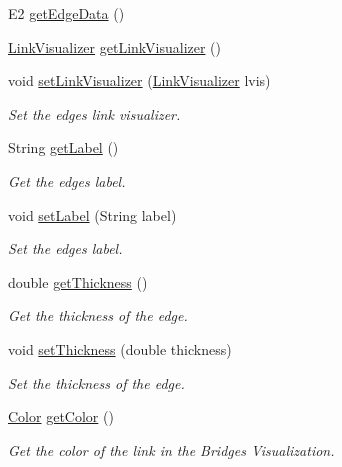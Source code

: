 \begin{DoxyCompactItemize}
\item 
E2 \hyperlink{classbridges_1_1base_1_1_edge_a19a623d647eb17b7e53f1360577b0703}{get\+Edge\+Data} ()
\item 
\hyperlink{classbridges_1_1base_1_1_link_visualizer}{Link\+Visualizer} \hyperlink{classbridges_1_1base_1_1_edge_a11c655622b8a54f2931f59b1d256f84a}{get\+Link\+Visualizer} ()
\item 
void \hyperlink{classbridges_1_1base_1_1_edge_a1bb8008507d26245468bf9d0f1452072}{set\+Link\+Visualizer} (\hyperlink{classbridges_1_1base_1_1_link_visualizer}{Link\+Visualizer} lvis)
\begin{DoxyCompactList}\small\item\em Set the edge\textquotesingle{}s link visualizer. \end{DoxyCompactList}\item 
String \hyperlink{classbridges_1_1base_1_1_edge_a8663708d930e8df460c57d8bdbab44b2}{get\+Label} ()
\begin{DoxyCompactList}\small\item\em Get the edge\textquotesingle{}s label. \end{DoxyCompactList}\item 
void \hyperlink{classbridges_1_1base_1_1_edge_ad5f1d55a3c8caeb975f497dfe4f29242}{set\+Label} (String label)
\begin{DoxyCompactList}\small\item\em Set the edge\textquotesingle{}s label. \end{DoxyCompactList}\item 
double \hyperlink{classbridges_1_1base_1_1_edge_a3431e83235fc5d5dd5cf747ed4853881}{get\+Thickness} ()
\begin{DoxyCompactList}\small\item\em Get the thickness of the edge. \end{DoxyCompactList}\item 
void \hyperlink{classbridges_1_1base_1_1_edge_ae8d87539f03f04479e5f5710ea9bf260}{set\+Thickness} (double thickness)
\begin{DoxyCompactList}\small\item\em Set the thickness of the edge. \end{DoxyCompactList}\item 
\hyperlink{classbridges_1_1base_1_1_color}{Color} \hyperlink{classbridges_1_1base_1_1_edge_a243d9e6a57ebb570dda81bffe0cd4b77}{get\+Color} ()
\begin{DoxyCompactList}\small\item\em Get the color of the link in the Bridges Visualization. \end{DoxyCompactList}\item 

\end{DoxyCompactItemize}
